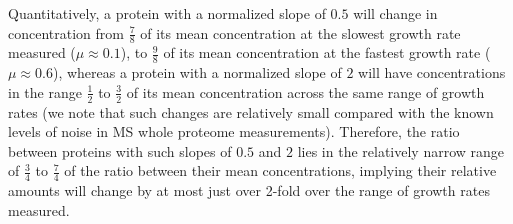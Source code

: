 Quantitatively, a protein with a normalized slope of $0.5$ will change in concentration from $\frac{7}{8}$ of its mean concentration at the slowest growth rate measured ($\mu \approx 0.1$), to $\frac{9}{8}$ of its mean concentration at the fastest growth rate ($\mu \approx 0.6$), whereas a protein with a normalized slope of $2$ will have concentrations in the range $\frac{1}{2}$ to $\frac{3}{2}$ of its mean concentration across the same range of growth rates (we note that such changes are relatively small compared with the known levels of noise in MS whole proteome measurements).
Therefore, the ratio between proteins with such slopes of $0.5$ and $2$ lies in the relatively narrow range of $\frac{3}{4}$ to $\frac{7}{4}$ of the ratio between their mean concentrations, implying their relative amounts will change by at most just over 2-fold over the range of growth rates measured.